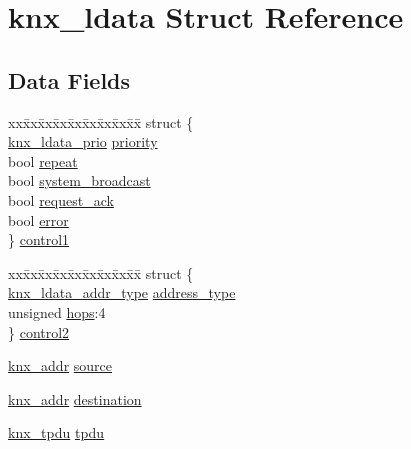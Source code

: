 \hypertarget{structknx__ldata}{}\section{knx\+\_\+ldata Struct Reference}
\label{structknx__ldata}
\subsection*{Data Fields}
\begin{DoxyCompactItemize}
\item 
\begin{tabbing}
xx\=xx\=xx\=xx\=xx\=xx\=xx\=xx\=xx\=\kill
struct \{\\
\>\hyperlink{ldata_8h_ac1575210de5e91cf85f849efa7f6b275}{knx\_ldata\_prio} \hyperlink{structknx__ldata_a87741fe097735a5f77fcd73ebecc4d30}{priority}\\
\>bool \hyperlink{structknx__ldata_a8f5c98118b6a2fbbd902a700699ef0a7}{repeat}\\
\>bool \hyperlink{structknx__ldata_a33061511aae90bd36a73153cf461ae14}{system\_broadcast}\\
\>bool \hyperlink{structknx__ldata_a4dcd21b2f2cb1e105bf8eeffea378af3}{request\_ack}\\
\>bool \hyperlink{structknx__ldata_a9975ca659781a65fa468299c553040d1}{error}\\
\} \hyperlink{structknx__ldata_a9e42111fdc076358ad027879c80e9151}{control1}\\

\end{tabbing}\item 
\begin{tabbing}
xx\=xx\=xx\=xx\=xx\=xx\=xx\=xx\=xx\=\kill
struct \{\\
\>\hyperlink{ldata_8h_a30997f1c52ab825cf528e639c83d8c62}{knx\_ldata\_addr\_type} \hyperlink{structknx__ldata_aa2e94b1374d52a1734c74f8cf692bb11}{address\_type}\\
\>unsigned \hyperlink{structknx__ldata_ad18b3beef28a5ea401b8a9ef766ad258}{hops}:4\\
\} \hyperlink{structknx__ldata_a34dfef899ceff0e56c9b6775b0208442}{control2}\\

\end{tabbing}\item 
\hyperlink{address_8h_a88b9bc5d57b990da72d16dc49b9448df}{knx\+\_\+addr} \hyperlink{structknx__ldata_a97901fe0a2260a11dec4c1685cff63b6}{source}
\item 
\hyperlink{address_8h_a88b9bc5d57b990da72d16dc49b9448df}{knx\+\_\+addr} \hyperlink{structknx__ldata_a2c84f12aa89d8d00ac24f3bb9305d739}{destination}
\item 
\hyperlink{structknx__tpdu}{knx\+\_\+tpdu} \hyperlink{structknx__ldata_a096ce543e8bf7400388c0babf862817c}{tpdu}
\end{DoxyCompactItemize}


